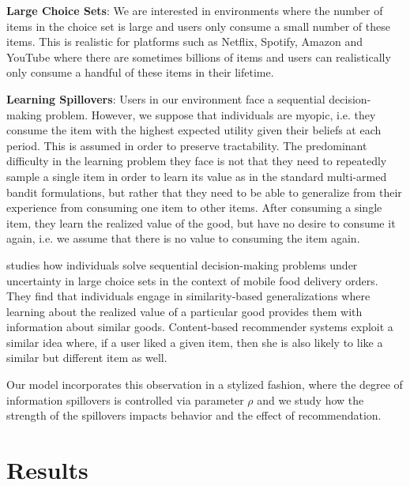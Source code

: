 \documentclass[sigconf, anonymous, review]{acmart}
\begin{document}
\noindent \textbf{Large Choice Sets}: We are interested in environments where the number of items in the choice set is large and users only consume a small number of these items. This is realistic for platforms such as Netflix, Spotify, Amazon and YouTube where there are sometimes billions of items and users can realistically only consume a handful of these items in their lifetime.\par

\noindent \textbf{Learning Spillovers}: Users in our environment face a sequential decision-making problem. However, we suppose that individuals are myopic, i.e. they consume the item with the highest expected utility given their beliefs at each period. This is assumed in order to preserve tractability. The predominant difficulty in the learning problem they face is not that they need to repeatedly sample a single item in order to learn its value as in the standard multi-armed bandit formulations, but rather that they need to be able to generalize from their experience from consuming one item to other items. After consuming a single item, they learn the realized value of the good, but have no desire to consume it again, i.e. we assume that there is no value to consuming the item again.
\par

\cite{schulz2019structured} studies how individuals solve sequential decision-making problems under uncertainty in large choice sets in the context of mobile food delivery orders. They find that individuals engage in similarity-based generalizations where learning about the realized value of a particular good provides them with information about similar goods. Content-based recommender systems exploit a similar idea where, if a user liked a given item, then she is also likely to like a similar but different item as well.
\par

Our model incorporates this observation in a stylized fashion, where the degree of information spillovers is controlled via parameter $\rho$ and we study how the strength of the spillovers impacts behavior and the effect of recommendation.
\par

\section{Results}
\end{document}

